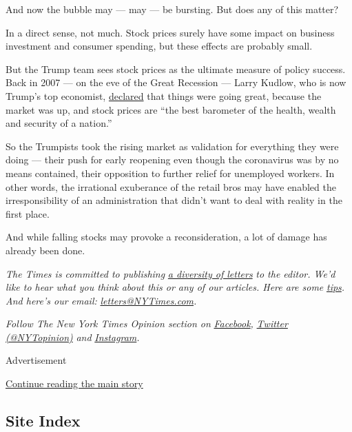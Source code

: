 And now the bubble may --- may --- be bursting. But does any of this
matter?

In a direct sense, not much. Stock prices surely have some impact on
business investment and consumer spending, but these effects are
probably small.

But the Trump team sees stock prices as the ultimate measure of policy
success. Back in 2007 --- on the eve of the Great Recession --- Larry
Kudlow, who is now Trump's top economist,
\href{https://www.realclearpolitics.com/articles/2007/07/a_stock_market_vote_of_confide.html}{declared}
that things were going great, because the market was up, and stock
prices are ``the best barometer of the health, wealth and security of a
nation.''

So the Trumpists took the rising market as validation for everything
they were doing --- their push for early reopening even though the
coronavirus was by no means contained, their opposition to further
relief for unemployed workers. In other words, the irrational exuberance
of the retail bros may have enabled the irresponsibility of an
administration that didn't want to deal with reality in the first place.

And while falling stocks may provoke a reconsideration, a lot of damage
has already been done.

\emph{The Times is committed to publishing}
\href{https://www.nytimes3xbfgragh.onion/2019/01/31/opinion/letters/letters-to-editor-new-york-times-women.html}{\emph{a
diversity of letters}} \emph{to the editor. We'd like to hear what you
think about this or any of our articles. Here are some}
\href{https://help.nytimes3xbfgragh.onion/hc/en-us/articles/115014925288-How-to-submit-a-letter-to-the-editor}{\emph{tips}}\emph{.
And here's our email:}
\href{mailto:letters@NYTimes.com}{\emph{letters@NYTimes.com}}\emph{.}

\emph{Follow The New York Times Opinion section on}
\href{https://www.facebookcorewwwi.onion/nytopinion}{\emph{Facebook}}\emph{,}
\href{http://twitter.com/NYTOpinion}{\emph{Twitter (@NYTopinion)}}
\emph{and}
\href{https://www.instagram.com/nytopinion/}{\emph{Instagram}}\emph{.}

Advertisement

\protect\hyperlink{after-bottom}{Continue reading the main story}

\hypertarget{site-index}{%
\subsection{Site Index}\label{site-index}}

